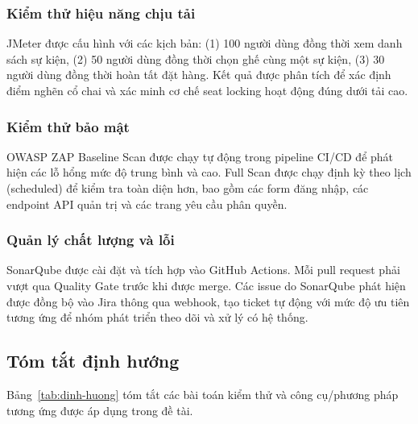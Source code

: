 \documentclass[../main.tex]{subfiles}
\begin{document}
\subsubsection{Kiểm thử hiệu năng chịu tải}

JMeter được cấu hình với các kịch bản: (1) 100 người dùng đồng thời xem danh sách sự kiện, (2) 50 người dùng đồng thời chọn ghế cùng một sự kiện, (3) 30 người dùng đồng thời hoàn tất đặt hàng. Kết quả được phân tích để xác định điểm nghẽn cổ chai và xác minh cơ chế seat locking hoạt động đúng dưới tải cao.

\subsubsection{Kiểm thử bảo mật}

OWASP ZAP Baseline Scan được chạy tự động trong pipeline CI/CD để phát hiện các lỗ hổng mức độ trung bình và cao. Full Scan được chạy định kỳ theo lịch (scheduled) để kiểm tra toàn diện hơn, bao gồm các form đăng nhập, các endpoint API quản trị và các trang yêu cầu phân quyền.

\subsubsection{Quản lý chất lượng và lỗi}

SonarQube được cài đặt và tích hợp vào GitHub Actions. Mỗi pull request phải vượt qua Quality Gate trước khi được merge. Các issue do SonarQube phát hiện được đồng bộ vào Jira thông qua webhook, tạo ticket tự động với mức độ ưu tiên tương ứng để nhóm phát triển theo dõi và xử lý có hệ thống.

\subsection{Tóm tắt định hướng}

Bảng~\ref{tab:dinh-huong} tóm tắt các bài toán kiểm thử và công cụ/phương pháp tương ứng được áp dụng trong đề tài.
\end{document}
